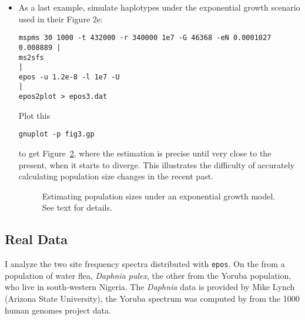 \documentclass[a4paper, english]{article}
\newcommand{\ty}{\texttt}
\begin{document}
\begin{itemize}
\begin{verbatim}
gnuplot -p fig2.gp
\end{verbatim}
to get Figure~\ref{fig:2b}. The fit between the median estimated
population size and its true value remains excellent. However, the
variation in estimates is again large, particularly toward the present.
\begin{figure}
  \begin{center}
    \scalebox{0.6}{}
  \end{center}
  \caption{Estimating population sizes under a model with one
    instantaneous size change. See text for details.}\label{fig:2b}
\end{figure}
\item As a last example, simulate haplotypes under
  the exponential growth scenario \cite{liu15:exp} used in their
  Figure 2e:
    \small
\begin{verbatim}
mspms 30 1000 -t 432000 -r 340000 1e7 -G 46368 -eN 0.0001027 0.008889 |
ms2sfs                                                                |
epos -u 1.2e-8 -l 1e7 -U                                              |
epos2plot > epos3.dat
\end{verbatim}
\normalsize
Plot this
\begin{verbatim}
gnuplot -p fig3.gp
\end{verbatim}
to get Figure~\ref{fig:2e}, where the estimation is precise until very
close to the present, when it starts to diverge. This illustrates
the difficulty of accurately calculating population size changes
in the recent past.
\begin{figure}
  \begin{center}
    \scalebox{0.6}{}
  \end{center}
  \caption{Estimating population sizes under an exponential growth
    model. See text for details.}\label{fig:2e}
\end{figure}
\end{itemize}

\subsection{Real Data}
I analyze the two site frequency spectra distributed with
\ty{epos}. On the from a population of water flea, \textit{Daphnia
  pulex}, the other from the Yoruba population, who live in
south-western Nigeria. The \textit{Daphnia} data is provided by Mike
Lynch (Arizona State University), the Yoruba spectrum was computed by
\cite{lap17:acc} from the 1000 human genomes project data.
\end{document}
